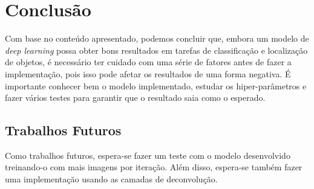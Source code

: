 \chapter{Conclusão}
\label{cap:6}

Com base no conteúdo apresentado, podemos concluir que, embora um modelo de \textit{deep learning} possa obter bons resultados em tarefas de classificação e localização de objetos, é necessário ter cuidado com uma série de fatores antes de fazer a implementação, pois isso pode afetar os resultados de uma forma negativa. É importante conhecer bem o modelo implementado, estudar os hiper-parâmetros e fazer vários testes para garantir que o resultado saia como o esperado.

\section{Trabalhos Futuros}

Como trabalhos futuros, espera-se fazer um teste com o modelo desenvolvido treinando-o com mais imagens por iteração. Além disso, espera-se também fazer uma implementação usando as camadas de deconvolução.